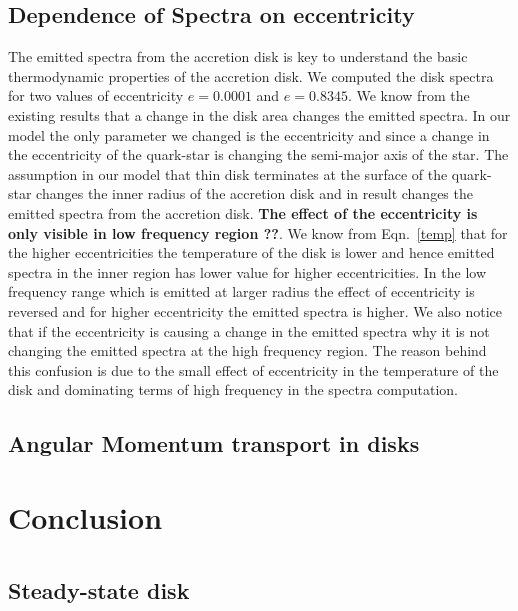 \documentclass[useAMS,usenatbib]{mn2e}
\begin{document}
\subsection{Dependence of Spectra on eccentricity}
The emitted spectra from the accretion disk is key to understand the basic thermodynamic properties of the accretion disk. We computed the disk spectra for two values of eccentricity $e = 0.0001$ and $e = 0.8345$. We know from the existing results that a change in the disk area changes the emitted spectra. In our model the only parameter we changed is the eccentricity and since a change in the eccentricity of the quark-star is changing the semi-major axis of the star. The assumption in our model that thin disk terminates at the surface of the quark-star changes the inner radius of the accretion disk and in result changes the emitted spectra from the accretion disk. \textbf{The effect of the eccentricity is only visible in low frequency region ??}. We know from Eqn.~\ref{temp} that for the higher eccentricities the temperature of the disk is lower and hence emitted spectra in the inner region has lower value for higher eccentricities. In the low frequency range which is emitted at larger radius the effect of eccentricity is reversed and for higher eccentricity the emitted spectra is higher. We also notice that if the eccentricity is causing a change in the emitted spectra why it is not changing the emitted spectra at the high frequency region. The reason behind this confusion is due to the small effect of eccentricity in the temperature of the disk and dominating terms of high frequency in the spectra computation.  

\subsection{Angular Momentum transport in disks}
\section{Conclusion}
\appendix
\section{}
\subsection{Steady-state disk}
\label{a1}
\end{document}
